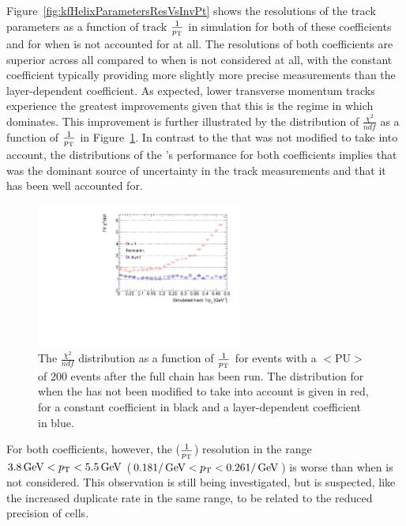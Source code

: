 Figure~\ref{fig:kfHelixParametersResVsInvPt} shows the resolutions of the track parameters as a function of track $\frac{1}{p_{\mathrm{T}}}$ in simulation for both of these \MS coefficients and for when \MS is not accounted for at all.
The resolutions of both \MS coefficients are superior across all \pt compared to when \MS is not considered at all, with the constant \MS coefficient typically providing more slightly more precise measurements than the layer-dependent coefficient.  
As expected, lower transverse momentum tracks experience the greatest improvements given that this is the regime in which \MS dominates.
This improvement is further illustrated by the distribution of $\frac{\chi^{2}}{ndf}$ as a function of $\frac{1}{p_{\mathrm{T}}}$ in Figure~\ref{fig:2GeVTiltChi2Ndf}.
In contrast to the \KF that was not modified to take \MS into account, the distributions of the \KF's performance for both \MS coefficients implies that \MS was the dominant source of uncertainty in the track measurements and that it has been well accounted for.

\begin{figure}[htb]
\centering
\includegraphics[width=0.6\textwidth]{figs/tk-upgrade/results-lowPtTracking/kfChi2NdfVsInvPtTiltedGeometry_5000.pdf}
\caption{The $\frac{\chi^{2}}{ndf}$ distribution as a function of $\frac{1}{p_{\mathrm{T}}}$ for \ttbar events with a $<\textrm{PU}>$ of 200 events after the full chain has been run. The distribution for when the \KF has not been modified to take \MS into account is given in red, for a constant \MS coefficient in black and a layer-dependent \MS coefficient in blue.
}
\label{fig:2GeVTiltChi2Ndf}	
\end{figure}

For both \MS coefficients, however, the \pt($\frac{1}{p_{\mathrm{T}}}$) resolution in the range $3.8 \,\text{Ge\hspace{-.08em}V} < p_{\mathrm{T}} < 5.5\,\text{Ge\hspace{-.08em}V}$ ($0.18 1/\,\text{Ge\hspace{-.08em}V} < p_{\mathrm{T}} < 0.26 1/\,\text{Ge\hspace{-.08em}V}$) is worse than when \MS is not considered.
This observation is still being investigated, but is suspected, like the increased duplicate rate in the same \pT range, to be related to the reduced precision of \HT cells.

